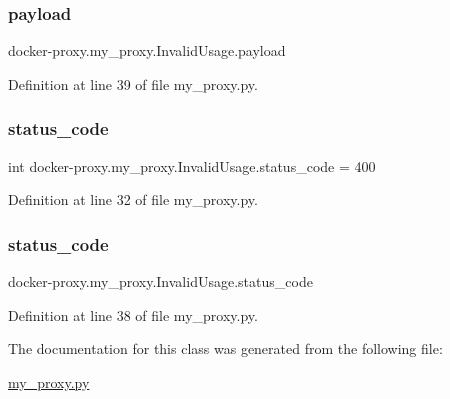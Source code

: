 \hypertarget{classdocker-proxy_1_1my__proxy_1_1_invalid_usage_a658b9343c56fde3e1753fe8ad1e1a158}{}\label{classdocker-proxy_1_1my__proxy_1_1_invalid_usage_a658b9343c56fde3e1753fe8ad1e1a158} 
\subsubsection{\texorpdfstring{payload}{payload}}
{\footnotesize\ttfamily docker-\/proxy.\+my\+\_\+proxy.\+Invalid\+Usage.\+payload}



Definition at line 39 of file my\+\_\+proxy.\+py.

\hypertarget{classdocker-proxy_1_1my__proxy_1_1_invalid_usage_aa06f3c7722ee51c93e799a0e57f67a32}{}\label{classdocker-proxy_1_1my__proxy_1_1_invalid_usage_aa06f3c7722ee51c93e799a0e57f67a32} 
\subsubsection{\texorpdfstring{status\+\_\+code}{status\_code}\hspace{0.1cm}{\footnotesize\ttfamily [1/2]}}
{\footnotesize\ttfamily int docker-\/proxy.\+my\+\_\+proxy.\+Invalid\+Usage.\+status\+\_\+code = 400\hspace{0.3cm}{\ttfamily [static]}}



Definition at line 32 of file my\+\_\+proxy.\+py.

\hypertarget{classdocker-proxy_1_1my__proxy_1_1_invalid_usage_a6503499a33bc2de008fb69c03f453eec}{}\label{classdocker-proxy_1_1my__proxy_1_1_invalid_usage_a6503499a33bc2de008fb69c03f453eec} 
\subsubsection{\texorpdfstring{status\+\_\+code}{status\_code}\hspace{0.1cm}{\footnotesize\ttfamily [2/2]}}
{\footnotesize\ttfamily docker-\/proxy.\+my\+\_\+proxy.\+Invalid\+Usage.\+status\+\_\+code}



Definition at line 38 of file my\+\_\+proxy.\+py.



The documentation for this class was generated from the following file\+:\begin{DoxyCompactItemize}
\item 
\hyperlink{my__proxy_8py}{my\+\_\+proxy.\+py}\end{DoxyCompactItemize}
